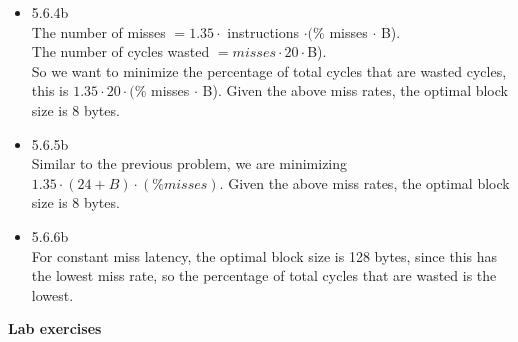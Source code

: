 \documentclass[a4paper]{article}
\begin{document}
\begin{itemize}
\item{5.6.4b} \\
The number of misses $= 1.35 \cdot$ instructions $\cdot (\%$ misses $\cdot$ B). \\
The number of cycles wasted $= misses \cdot 20 \cdot $B). \\
So we want to minimize the percentage of total cycles that are wasted cycles, this is $1.35 \cdot 20 \cdot (\%$ misses $\cdot$ B). Given the above miss rates, the optimal block size is 8 bytes. \\


\item{5.6.5b} \\
Similar to the previous problem, we are minimizing $1.35 \cdot (24+B) \cdot (\% misses)$. Given the above miss rates, the optimal block size is 8 bytes. \\


\item{5.6.6b} \\
For constant miss latency, the optimal block size is 128 bytes, since this has the lowest miss rate, so the percentage of total cycles that are wasted is the lowest.

\end{itemize}



\textbf{\large{Lab exercises}}
\end{document}
